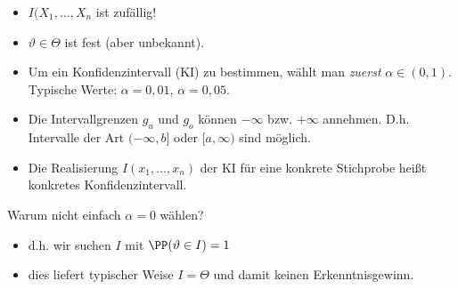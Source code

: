 \documentclass{scrreprt}
\begin{document}
\begin{itemize}
\item $I(X_1, \ldots, X_n$ ist zufällig!
\item $\vartheta \in \Theta$ ist fest (aber unbekannt).
\item Um ein Konfidenzintervall (KI) zu bestimmen, wählt man \emph{zuerst} $\alpha\in (0,1)$. Typische Werte: $\alpha = 0,01$, $\alpha = 0,05$.
\item Die Intervallgrenzen $g_u$ und $g_o$ können $-\infty$ bzw. $+\infty$ annehmen. D.h. Intervalle der Art $(-\infty, b]$ oder $[a,\infty)$ sind möglich.
\item Die Realisierung $I(x_1, \ldots, x_n)$ der KI für eine konkrete Stichprobe heißt konkretes Konfidenzintervall.
\end{itemize}
Warum nicht einfach $\alpha = 0$ wählen?
\begin{itemize}
\item d.h. wir suchen $I$ mit $\PP(\vartheta \in I) =1$
\item dies liefert typischer Weise $I=\Theta$ und damit keinen Erkenntnisgewinn.
\end{itemize}
\end{document}
